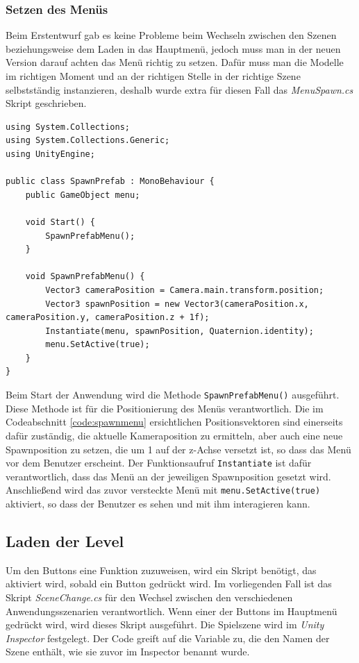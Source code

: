 \subsubsection{Setzen des Menüs}
Beim Erstentwurf gab es keine Probleme beim Wechseln zwischen den Szenen beziehungsweise dem Laden in das Hauptmenü, jedoch muss man in der neuen Version darauf achten das Menü richtig zu setzen. Dafür muss man die Modelle im richtigen Moment und an der richtigen Stelle in der richtige Szene selbstständig instanzieren, deshalb wurde extra für diesen Fall das \textit{MenuSpawn.cs} Skript geschrieben.

\begin{lstlisting}[style=csharp, caption=Menueinstanzierung bei Neuladen., label=code:spawnmenu]
using System.Collections;
using System.Collections.Generic;
using UnityEngine;

public class SpawnPrefab : MonoBehaviour {
    public GameObject menu;

    void Start() {
        SpawnPrefabMenu();
    }

    void SpawnPrefabMenu() {
        Vector3 cameraPosition = Camera.main.transform.position;
        Vector3 spawnPosition = new Vector3(cameraPosition.x, cameraPosition.y, cameraPosition.z + 1f);
        Instantiate(menu, spawnPosition, Quaternion.identity);
        menu.SetActive(true);
    }
}
\end{lstlisting}

Beim Start der Anwendung wird die Methode \texttt{SpawnPrefabMenu()} ausgeführt. Diese Methode ist für die Positionierung des Menüs verantwortlich. Die im Codeabschnitt \ref{code:spawnmenu} ersichtlichen Positionsvektoren sind einerseits dafür zuständig, die aktuelle Kameraposition zu ermitteln, aber auch eine neue Spawnposition zu setzen, die um 1 auf der z-Achse versetzt ist, so dass das Menü vor dem Benutzer erscheint. Der Funktionsaufruf \texttt{Instantiate} ist dafür verantwortlich, dass das Menü an der jeweiligen Spawnposition gesetzt wird. Anschließend wird das zuvor versteckte Menü mit \texttt{menu.SetActive(true)} aktiviert, so dass der Benutzer es sehen und mit ihm interagieren kann.

\subsection{Laden der Level}
Um den Buttons eine Funktion zuzuweisen, wird ein Skript benötigt, das aktiviert wird, sobald ein Button gedrückt wird.
Im vorliegenden Fall ist das Skript \textit{SceneChange.cs} für den Wechsel zwischen den verschiedenen Anwendungsszenarien verantwortlich.
Wenn einer der Buttons im Hauptmenü gedrückt wird, wird dieses Skript ausgeführt. Die Spielszene wird im \textit{Unity Inspector}
festgelegt. Der Code greift auf die Variable zu, die den Namen der Szene enthält, wie sie zuvor im Inspector benannt wurde.

